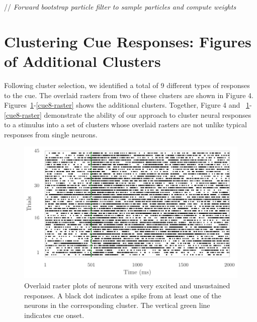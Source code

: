 \documentclass{article}
\begin{document}
\begin{algorithm}[H]
\begin{algorithmic}[1]
    \item[\quad \quad // \emph{Forward bootstrap particle filter to sample particles and compute weights}]
    \EndFor
   	 \EndFor
    \EndFor
    \EndFor \\
   \end{algorithmic}
\end{algorithm}

\section{Clustering Cue Responses: Figures of Additional Clusters}

Following cluster selection, we identified a total of 9 different types of responses to the cue. The overlaid rasters from two of these clusters are shown in Figure 4. Figures~{\ref{cue0-raster}-\ref{cue8-raster}} shows the additional clusters. Together, Figure 4 and ~{\ref{cue0-raster}-\ref{cue8-raster}} demonstrate the ability of our approach to cluster neural responses to a stimulus into a set of clusters whose overlaid rasters are not unlike typical responses from single neurons.
\begin{figure}[H]
\begin{center}
\includegraphics[scale=1]{img/cue_0.pdf}
\end{center}
\caption{Overlaid raster plots of neurons with very excited and unsustained responses. A black dot indicates a spike from at least one of the neurons in the corresponding cluster. The vertical green line indicates cue onset.}\label{cue0-raster}
\end{figure}
\end{document}
